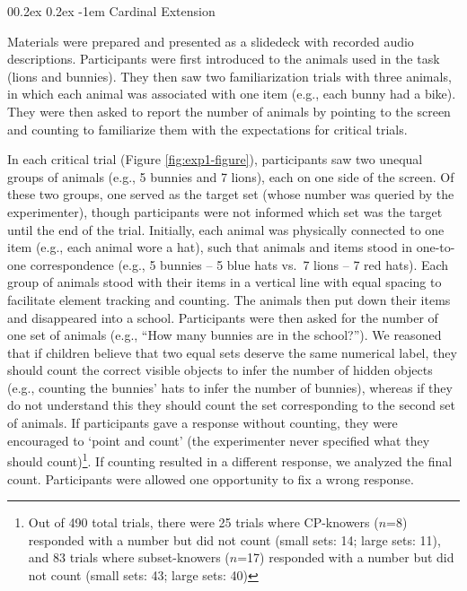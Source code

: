 \documentclass[
  man,floatsintext]{apa7}
\makeatletter
\let\oldparagraph\paragraph
\renewcommand{\paragraph}{
    \@ifstar
      \xxxParagraphStar
      \xxxParagraphNoStar
  }
\newcommand{\xxxParagraphStar}[1]{\oldparagraph*{#1}\mbox{}}
\newcommand{\xxxParagraphNoStar}[1]{\oldparagraph{#1}\mbox{}}
\renewcommand{\paragraph}{\@startsection{paragraph}{4}{\parindent}%
  {0\baselineskip \@plus 0.2ex \@minus 0.2ex}%
  {-1em}%
  {\normalfont\normalsize\bfseries\itshape\typesectitle}}
\renewcommand{\paragraph}{\@startsection{paragraph}{4}{\parindent}%
  {0\baselineskip \@plus 0.2ex \@minus 0.2ex}%
  {-1em}%
  {\normalfont\normalsize\bfseries\typesectitle}}
\makeatother
\begin{document}
\paragraph{Cardinal Extension}\label{cardinal-extension}

Materials were prepared and presented as a slidedeck with recorded audio descriptions. Participants were first introduced to the animals used in the task (lions and bunnies). They then saw two familiarization trials with three animals, in which each animal was associated with one item (e.g., each bunny had a bike). They were then asked to report the number of animals by pointing to the screen and counting to familiarize them with the expectations for critical trials.

In each critical trial (Figure \ref{fig:exp1-figure}), participants saw two unequal groups of animals (e.g., 5 bunnies and 7 lions), each on one side of the screen. Of these two groups, one served as the target set (whose number was queried by the experimenter), though participants were not informed which set was the target until the end of the trial. Initially, each animal was physically connected to one item (e.g., each animal wore a hat), such that animals and items stood in one-to-one correspondence (e.g., 5 bunnies -- 5 blue hats vs.~7 lions -- 7 red hats). Each group of animals stood with their items in a vertical line with equal spacing to facilitate element tracking and counting. The animals then put down their items and disappeared into a school. Participants were then asked for the number of one set of animals (e.g., ``How many bunnies are in the school?''). We reasoned that if children believe that two equal sets deserve the same numerical label, they should count the correct visible objects to infer the number of hidden objects (e.g., counting the bunnies' hats to infer the number of bunnies), whereas if they do not understand this they should count the set corresponding to the second set of animals. If participants gave a response without counting, they were encouraged to `point and count' (the experimenter never specified what they should count)\footnote{Out of 490 total trials, there were 25 trials where CP-knowers (\(n\)=8) responded with a number but did not count (small sets: 14; large sets: 11), and 83 trials where subset-knowers (\(n\)=17) responded with a number but did not count (small sets: 43; large sets: 40)}. If counting resulted in a different response, we analyzed the final count. Participants were allowed one opportunity to fix a wrong response.
\end{document}
